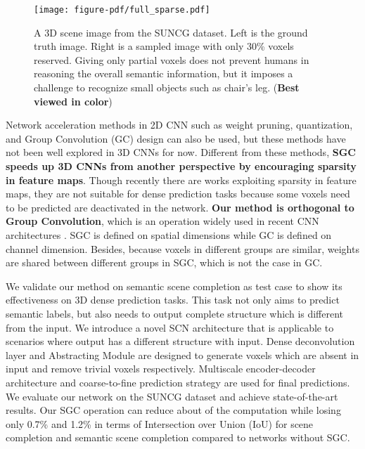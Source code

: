 \documentclass[runningheads]{llncs}
\begin{document}
\begin{figure}[t]
\centering
\texttt{[image: figure-pdf/full\_sparse.pdf]}
\caption{A 3D scene image from the SUNCG dataset. Left is the ground truth image. Right is a sampled image with only 30\% voxels reserved. Giving only partial voxels does not prevent humans in reasoning the overall semantic information, but it imposes a challenge to recognize small objects such as chair{'}s leg. (\textbf{Best viewed in color})}
\label{fig:full_sparse}
\end{figure}

Network acceleration methods in 2D CNN such as weight pruning, quantization, and Group Convolution (GC) design \cite{2017arXiv170404861H,zhang2018shufflenet} can also be used, but these methods have not been well explored in 3D CNNs for now. Different from these methods, \textbf{SGC speeds up 3D CNNs from another perspective by encouraging sparsity in feature maps}.
Though recently there are works \cite{engelcke2017vote3deep,hackel2018inference} exploiting sparsity in feature maps, they are not suitable for dense prediction tasks
because some voxels need to be predicted are deactivated in the network.
\textbf{Our method is orthogonal to Group Convolution}, which is an operation widely used in recent CNN architectures \cite{krizhevsky2012imagenet,xie2017aggregated,chollet2017xception}. SGC is defined on spatial dimensions while GC is defined on channel dimension. Besides, because voxels in different groups are similar, weights are shared between different groups in SGC, which is not the case in GC.

We validate our method on semantic scene completion as test case to show its effectiveness on 3D dense prediction tasks. This task not only aims to predict semantic labels, but also needs to output complete structure which is different from the input.
We introduce a novel SCN architecture that is applicable to scenarios where output has a different structure with input. Dense deconvolution layer and Abstracting Module are designed to generate voxels which are absent in input and remove trivial voxels respectively. Multiscale encoder-decoder architecture and coarse-to-fine prediction strategy are used for final predictions.
We evaluate our network on the SUNCG dataset \cite{song2016semantic} and achieve state-of-the-art results.
Our SGC operation can reduce about  of the computation while losing only 0.7\% and 1.2\% in terms of Intersection over Union (IoU) for scene completion and semantic scene completion compared to networks without SGC.
\end{document}
